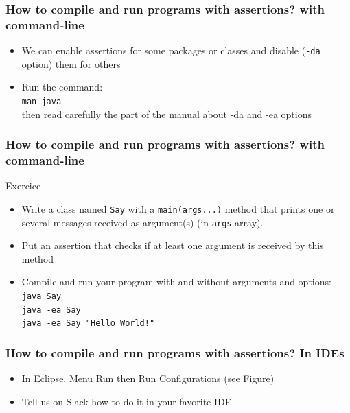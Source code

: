 \documentclass{beamer}
\begin{document}
\begin{frame}
  \frametitle{How to compile and run programs with assertions? with
    command-line}
  \begin{itemize}
  \item We can enable assertions for some packages or classes and
    disable (\texttt{-da} option) them for others
  \item Run the command:\\ \texttt{man java}\\
    then read carefully the part of the manual about -da and -ea
    options
  \end{itemize}
\end{frame}

\begin{frame}
  \frametitle{How to compile and run programs with assertions? with
    command-line}
  \begin{block}{Exercice}
    \begin{itemize}
    \item Write a class named \texttt{Say} with a
      \texttt{main(args...)}  method that prints one or several
      messages received as argument(s) (in \texttt{args} array).
  \item Put an assertion that checks if at least one argument is
    received by this method
  \item Compile and run your program with and without arguments and options:\\
  \texttt{java Say}\\
  \texttt{java -ea Say}\\
  \texttt{java -ea Say "Hello World!"}
  \end{itemize}
  \end{block}
\end{frame}

\begin{frame}
  \frametitle{How to compile and run programs with assertions? In IDEs}
  \begin{itemize}
  \item In Eclipse, Menu Run then Run Configurations (see Figure)
    \vspace{5cm}
  \item Tell us on Slack how to do it in your favorite IDE
\end{itemize}
\end{frame}
\end{document}
